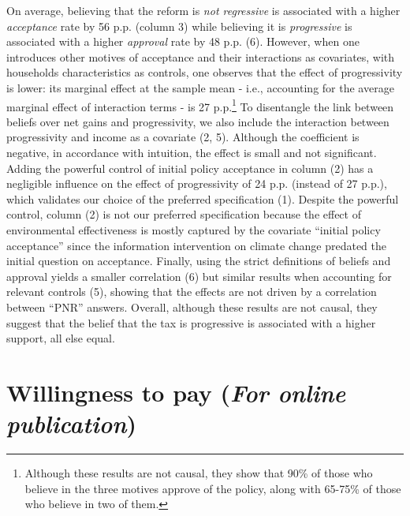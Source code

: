 \documentclass[12pt]{article} %
\begin{document}
\begin{appendices}
On average, believing that the reform is \textit{not regressive} is associated with a higher \textit{acceptance} rate by 56 p.p. (column 3) while believing it is \textit{progressive} is associated with a higher \textit{approval} rate by 48 p.p. (6). However, when one introduces other motives of acceptance and their interactions as covariates, with households characteristics as controls, one observes that the effect of progressivity is lower: its marginal effect at the sample mean - i.e., accounting for the average marginal effect of interaction terms - is 27 p.p.\footnote{Although these results are not causal, they show that 90\% of those who believe in the three motives approve of the policy, along with 65-75\% of those who believe in two of them.} To disentangle the link between beliefs over net gains and progressivity, we also include the interaction between progressivity and income as a covariate (2, 5). Although the coefficient is negative, in accordance with intuition, the effect is small and not significant. Adding the powerful control of initial policy acceptance in column (2) has a negligible influence on the effect of progressivity of 24 p.p. (instead of 27 p.p.), which validates our choice of the preferred specification (1). Despite the powerful control, column (2) is not our preferred specification because the effect of environmental effectiveness is mostly captured by the covariate ``initial policy acceptance'' since the information intervention on climate change predated the initial question on acceptance. Finally, using the strict definitions of beliefs and approval yields a smaller correlation (6) but similar results when accounting for relevant controls (5), showing that the effects are not driven by a correlation between ``PNR'' answers. Overall, although these results are not causal, they suggest that the belief that the tax is progressive is associated with a higher support, all else equal.



\section{Willingness to pay  (\emph{For online publication})}\label{sec:WTP}


\end{appendices}
\end{document}
